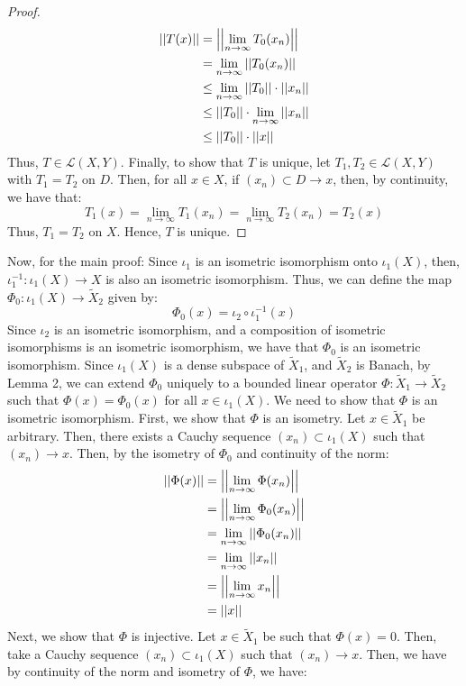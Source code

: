 \documentclass[12pt]{article}
\begin{document}
\begin{solution}
\begin{proof}
\begin{align*}
            ||T(x)|| &= \left\vert\left\vert\lim_{n \to \infty} T_0(x_n)\right\vert\right\vert \\
            &= \lim_{n \to \infty} ||T_0(x_n)|| \\
            &\leq \lim_{n \to \infty} ||T_0|| \cdot ||x_n|| \\
            &\leq ||T_0|| \cdot \lim_{n \to \infty} ||x_n|| \\
            &\leq ||T_0|| \cdot ||x||
        \end{align*}
        Thus, $T \in \mathcal{L}(X, Y)$. \bbni
        Finally, to show that $T$ is unique, let $T_1, T_2 \in \mathcal{L}(X, Y)$ with $T_1 = T_2$ on $D$. Then, for all $x \in X$, if $(x_n) \subset D \to x$, then, by continuity, we have that: 
        \[T_1(x)  = \lim_{n\to \infty} T_1(x_n) = \lim_{n\to \infty} T_2(x_n) = T_2(x)  \] 
        Thus, $T_1 = T_2$ on $X$. Hence, $T$ is unique.
    \end{proof}
    Now, for the main proof: Since $\iota_1$ is an isometric isomorphism onto $\iota_1(X)$, then, $\iota_1^{-1}: \iota_1(X) \to X$ is also an isometric isomorphism. Thus, we can define the map $\Phi_0: \iota_1(X) \to \tilde{X}_2$ given by:
    \[ \Phi_0(x) = \iota_2 \circ \iota_1^{-1}(x)\]
    Since $\iota_2$ is an isometric isomorphism, and a composition of isometric isomorphisms is an isometric isomorphism, we have that $\Phi_0$ is an isometric isomorphism. \bbni
    Since $\iota_1(X)$ is a dense subspace of $\tilde{X}_1$, and $\tilde{X}_2$ is Banach, by Lemma 2, we can extend $\Phi_0$ uniquely to a bounded linear operator $\Phi: \tilde{X}_1 \to \tilde{X}_2$ such that $\Phi(x) = \Phi_0(x)$ for all $x \in \iota_1(X)$. \bbni
    We need to show that $\Phi$ is an isometric isomorphism. \bbni
    First, we show that $\Phi$ is an isometry. Let $x \in \tilde{X}_1$ be arbitrary. Then, there exists a Cauchy sequence $(x_n) \subset \iota_1(X)$ such that $(x_n) \to x$. Then, by the isometry of $\Phi_0$ and continuity of the norm:
    \begin{align*}
        ||\Phi(x)|| &= \left\vert\left\vert\lim_{n \to \infty} \Phi(x_n)\right\vert\right\vert \\
        &= \left\vert\left\vert\lim_{n \to \infty} \Phi_0(x_n)\right\vert\right\vert \\
        &= \lim_{n \to \infty} ||\Phi_0(x_n)|| \\
        &= \lim_{n \to \infty} ||x_n|| \\
        &= \left\vert\left\vert\lim_{n \to \infty} x_n\right\vert\right\vert \\
        &= ||x|| 
    \end{align*}
    Next, we show that $\Phi$ is injective. Let $x \in \tilde{X}_1$ be such that $\Phi(x) = 0$. Then, take a Cauchy sequence $(x_n) \subset \iota_1(X)$ such that $(x_n) \to x$. Then, we have by continuity of the norm and isometry of $\Phi$, we have:

\end{solution}
\end{document}
